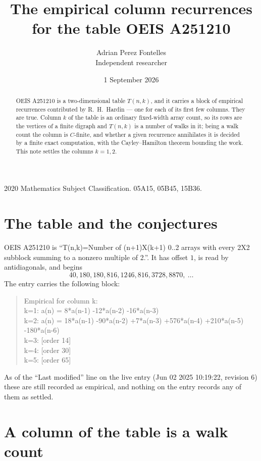 \documentclass[11pt,a4paper]{article}
\title{The empirical column recurrences for the table OEIS A251210}
\author{Adrian Perez Fontelles\\ \small Independent researcher}
\date{1 September 2026}
\theoremstyle{plain}
\theoremstyle{definition}
\begin{document}
\maketitle

\begin{abstract}
OEIS A251210 is a two-dimensional table $T(n,k)$, and it carries a block of empirical
recurrences contributed by R.~H.~Hardin --- one for each of its first few columns. They are
true. Column $k$ of the table is an ordinary fixed-width array count, so its rows are the
vertices of a finite digraph and $T(n,k)$ is a number of walks in it; being a walk count the
column is $C$-finite, and whether a given recurrence annihilates it is decided by a finite
exact computation, with the Cayley--Hamilton theorem bounding the work. This note settles the
columns $k=1, 2$.
\end{abstract}

\noindent\small 2020 Mathematics Subject Classification. 05A15, 05B45, 15B36.\normalsize

\section{The table and the conjectures}

OEIS A251210 is ``T(n,k)=Number of (n+1)X(k+1) 0..2 arrays with every 2X2 subblock summing to a nonzero multiple of 2.''. It has offset $1$, is
read by antidiagonals, and begins
\[
40, 180, 180, 816, 1246, 816, 3728, 8870,\ \dots
\]
The entry carries the following block:
\begin{quote}\small
Empirical for column k:\\
k=1: a(n) = 8*a(n-1) -12*a(n-2) -16*a(n-3)\\
k=2: a(n) = 18*a(n-1) -90*a(n-2) +7*a(n-3) +576*a(n-4) +210*a(n-5) -180*a(n-6)\\
k=3: [order 14]\\
k=4: [order 30]\\
k=5: [order 65]\\
\end{quote}
As of the ``Last modified'' line on the live entry (Jun 02 2025 10:19:22, revision 6) these are still
recorded as empirical, and nothing on the entry records any of them as settled.

\section{A column of the table is a walk count}
\end{document}
